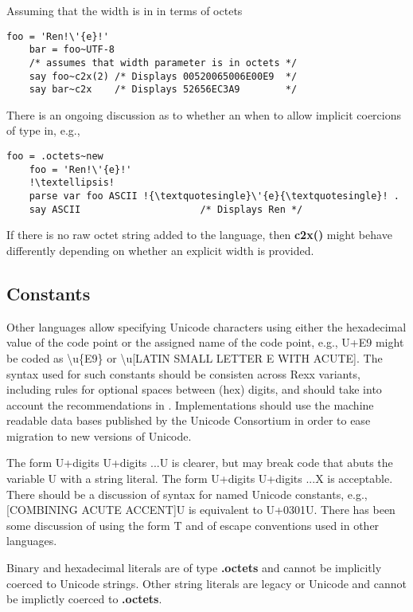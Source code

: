 \documentclass[b4paper]{article}
\begin{document}
Assuming that the width is in in terms of octets
\begin{lstlisting}[linewidth=35em]
    foo = 'Ren!\'{e}!'
    bar = foo~UTF-8
    /* assumes that width parameter is in octets */
    say foo~c2x(2) /* Displays 00520065006E00E9  */
    say bar~c2x    /* Displays 52656EC3A9        */
\end{lstlisting}

There is an ongoing discussion as to whether an when to allow implicit coercions of type in, e.g.,
\begin{lstlisting}[linewidth=35em]
    foo = .octets~new
    foo = 'Ren!\'{e}!'
    !\textellipsis!
    parse var foo ASCII !{\textquotesingle}\'{e}{\textquotesingle}! .
    say ASCII                     /* Displays Ren */
\end{lstlisting}

If there is no raw octet string added to the language,
then \textbf{c2x()} might behave differently depending on whether an explicit width is provided.

\subsection{Constants}
Other languages allow specifying Unicode characters using either
the hexadecimal value of the code point or the assigned name of the code point,
e.g., U+E9 might be coded as {\textbackslash}u\{E9\} or {\textbackslash}u[LATIN SMALL LETTER E WITH ACUTE].
The syntax used for such constants should be consisten across Rexx variants,
including rules for optional spaces between (hex) digits,
and should take into account the recommendations in \cite{RFC 5137}.
Implementations should use the machine readable data bases published by
the Unicode Consortium in order to ease migration to new versions of Unicode.

The form {\textquotesingle}U+digits U+digits ...{\textquotesingle}U is clearer,
but may break code that abuts the variable U with a string literal.
The form {\textquotesingle}U+digits U+digits ...{\textquotesingle}X is acceptable.
There should be a discussion of syntax for named Unicode constants, e.g.,
{\textquotesingle}[COMBINING ACUTE ACCENT]{\textquotesingle}U is
equivalent to {\textquotesingle}U+0301{\textquotesingle}U.
There has been some discussion of using the form
{\textquotesingle}\textellipsis{\textquotesingle}T and of escape conventions
used in other languages.

Binary and hexadecimal literals are of type \textbf{.octets} and cannot be implicitly coerced to Unicode strings.
Other string literals are legacy or Unicode and cannot be implictly coerced to \textbf{.octets}.
\end{document}
